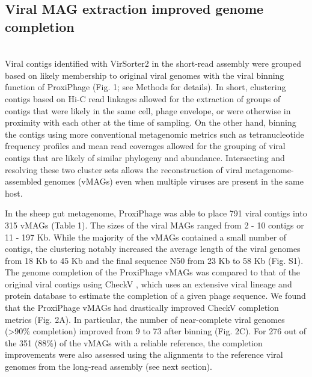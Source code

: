 \subsection*{Viral MAG extraction improved genome completion} \hfill\\
    Viral contigs identified with VirSorter2 \cite{RN24} in the short-read assembly were grouped based on likely membership to original viral genomes with the viral binning function of ProxiPhage (Fig. 1; see Methods for details). In short, clustering contigs based on Hi-C read linkages allowed for the extraction of groups of contigs that were likely in the same cell, phage envelope, or were otherwise in proximity with each other at the time of sampling. On the other hand, binning the contigs using more conventional metagenomic metrics such as tetranucleotide frequency profiles and mean read coverages allowed for the grouping of viral contigs that are likely of similar phylogeny and abundance. Intersecting and resolving these two cluster sets allows the reconstruction of viral metagenome-assembled genomes (vMAGs) even when multiple viruses are present in the same host. 
    
    In the sheep gut metagenome, ProxiPhage was able to place 791 viral contigs into 315 vMAGs (Table 1). The sizes of the viral MAGs ranged from 2 - 10 contigs or 11 - 197 Kb. While the majority of the vMAGs contained a small number of contigs, the clustering notably increased the average length of the viral genomes from 18 Kb to 45 Kb and the final sequence N50 from 23 Kb to 58 Kb (Fig. S1). The genome completion of the ProxiPhage vMAGs was compared to that of the original viral contigs using CheckV \cite{RN12}, which uses an extensive viral lineage and protein database to estimate the completion of a given phage sequence. We found that the ProxiPhage vMAGs had drastically improved CheckV completion metrics (Fig. 2A). In particular, the number of near-complete viral genomes (>90\% completion) improved from 9 to 73 after binning (Fig. 2C). For 276 out of the 351 (88\%) of the vMAGs with a reliable reference, the completion improvements were also assessed using the alignments to the reference viral genomes from the long-read assembly (see next section).


